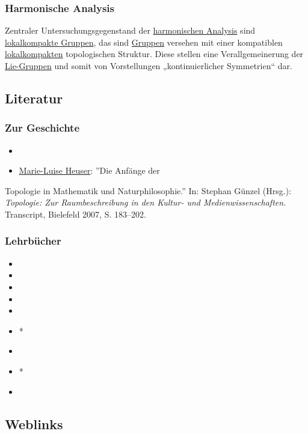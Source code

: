 \documentclass[12pt,]{article}
\begin{document}
\subsubsection{Harmonische Analysis}\label{harmonische-analysis}

Zentraler Untersuchungsgegenstand der
\href{Harmonische_Analysis}{harmonischen Analysis} sind
\href{lokalkompakte_Gruppe}{lokalkompakte Gruppen}, das sind
\href{Gruppe_(Mathematik)}{Gruppen} versehen mit einer kompatiblen
\href{lokalkompakt}{lokalkompakten} topologischen Struktur. Diese
stellen eine Verallgemeinerung der \href{Lie-Gruppe}{Lie-Gruppen} und
somit von Vorstellungen „kontinuierlicher Symmetrien`` dar.

\subsection{Literatur}\label{literatur}

\subsubsection{Zur Geschichte}\label{zur-geschichte}

\begin{itemize}
\item
\item
  \href{Marie-Luise_Heuser}{Marie-Luise Heuser}: ''Die Anfänge der
\end{itemize}

Topologie in Mathematik und Naturphilosophie.'' In: Stephan Günzel
(Hrsg.): \emph{Topologie: Zur Raumbeschreibung in den Kultur- und
Medienwissenschaften.} Transcript, Bielefeld 2007, S. 183--202.

\subsubsection{Lehrbücher}\label{lehrbuxfccher}

\begin{itemize}
\item
\item
\item
\item
\item
\item
  * 
\item
\item
  * 
\item
\end{itemize}

\subsection{Weblinks}\label{weblinks}
\end{document}
